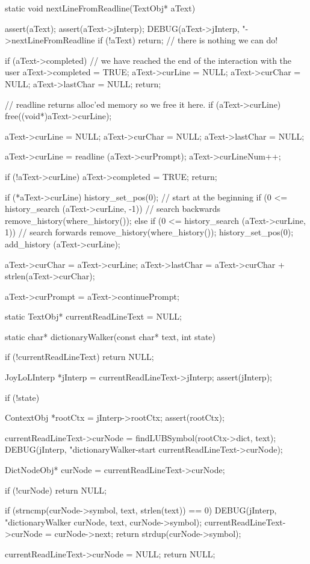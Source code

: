 \startCCode
static void nextLineFromReadline(TextObj* aText) {
  assert(aText);
  assert(aText->jInterp);
  DEBUG(aText->jInterp, "->nextLineFromReadline %
  if (!aText) return; // there is nothing we can do!

  if (aText->completed) {
    // we have reached the end of the interaction with the user
    aText->completed = TRUE;
    aText->curLine   = NULL;
    aText->curChar   = NULL;
    aText->lastChar  = NULL;
    return;
  }

  // readline returns alloc'ed memory so we free it here.
  if (aText->curLine) free((void*)aText->curLine);

  aText->curLine  = NULL;
  aText->curChar  = NULL;
  aText->lastChar = NULL;

  aText->curLine = readline (aText->curPrompt);
  aText->curLineNum++;
  
  if (!aText->curLine) {
    aText->completed = TRUE;
    return;
  }

  if (*aText->curLine) {
    history_set_pos(0); // start at the beginning
    if (0 <= history_search (aText->curLine, -1)) { // search backwards
      remove_history(where_history());
    } else if (0 <= history_search (aText->curLine, 1)) { // search forwards
      remove_history(where_history());
    }
    history_set_pos(0);
    add_history (aText->curLine);
  }

  aText->curChar  = aText->curLine;
  aText->lastChar = aText->curChar + strlen(aText->curChar);

  aText->curPrompt = aText->continuePrompt;
}
\stopCCode

\startCCode
static TextObj* currentReadLineText = NULL;
\stopCCode

\startCCode
static char* dictionaryWalker(const char* text, int state) {
  if (!currentReadLineText) return NULL;
  
  JoyLoLInterp *jInterp = currentReadLineText->jInterp;
  assert(jInterp);
  
  if (!state) {

    ContextObj *rootCtx = jInterp->rootCtx;
    assert(rootCtx);

    currentReadLineText->curNode =
      findLUBSymbol(rootCtx->dict, text);
    DEBUG(jInterp,
          "dictionaryWalker-start %
          currentReadLineText->curNode);
  }
  DictNodeObj* curNode = currentReadLineText->curNode;

  if (!curNode) return NULL;

  if (strncmp(curNode->symbol, text, strlen(text)) == 0) {
    DEBUG(jInterp,
          "dictionaryWalker %
          curNode, text, curNode->symbol);
    currentReadLineText->curNode = curNode->next;
    return strdup(curNode->symbol);
  }

  currentReadLineText->curNode = NULL;
  return NULL;
}

